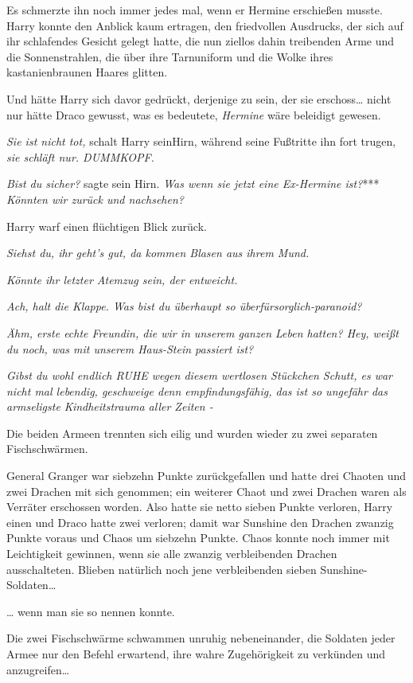 {Es schmerzte ihn noch immer jedes mal, wenn er Hermine erschießen musste. Harry konnte den Anblick kaum ertragen, den friedvollen Ausdrucks, der sich auf ihr schlafendes Gesicht gelegt hatte, die nun ziellos dahin treibenden Arme und die Sonnenstrahlen, die über ihre Tarnuniform und die Wolke ihres kastanienbraunen Haares glitten.

Und hätte Harry sich davor gedrückt, derjenige zu sein, der sie erschoss… nicht nur hätte Draco gewusst, was es bedeutete, \emph{Hermine} wäre beleidigt gewesen.

\emph{Sie ist nicht tot,} schalt Harry seinHirn, während seine Fußtritte ihn fort trugen, \emph{sie schläft nur. DUMMKOPF.}

\emph{Bist du sicher?} sagte sein Hirn. \emph{Was wenn sie jetzt eine Ex-Hermine ist?}*** \emph{Könnten wir zurück und nachsehen?}

Harry warf einen flüchtigen Blick zurück.

\emph{Siehst du, ihr geht's gut, da kommen Blasen aus ihrem Mund.}

\emph{Könnte ihr letzter Atemzug sein, der entweicht.}

\emph{Ach, halt die Klappe. Was bist du überhaupt so überfürsorglich-paranoid?}

\emph{Ähm, erste echte Freundin, die wir in unserem ganzen Leben hatten? Hey, weißt du noch, was mit unserem Haus-Stein passiert ist?}

\emph{Gibst du wohl endlich RUHE wegen diesem wertlosen Stückchen Schutt, es war nicht mal lebendig, geschweige denn empfindungsfähig, das ist so ungefähr das armseligste Kindheitstrauma aller Zeiten -}

Die beiden Armeen trennten sich eilig und wurden wieder zu zwei separaten Fischschwärmen.

General Granger war siebzehn Punkte zurückgefallen und hatte drei Chaoten und zwei Drachen mit sich genommen; ein weiterer Chaot und zwei Drachen waren als Verräter erschossen worden. Also hatte sie netto sieben Punkte verloren, Harry einen und Draco hatte zwei verloren; damit war Sunshine den Drachen zwanzig Punkte voraus und Chaos um siebzehn Punkte. Chaos konnte noch immer mit Leichtigkeit gewinnen, wenn sie alle zwanzig verbleibenden Drachen ausschalteten. Blieben natürlich noch jene verbleibenden sieben Sunshine-Soldaten…

… wenn man sie so nennen konnte.

Die zwei Fischschwärme schwammen unruhig nebeneinander, die Soldaten jeder Armee nur den Befehl erwartend, ihre wahre Zugehörigkeit zu verkünden und anzugreifen…

}

